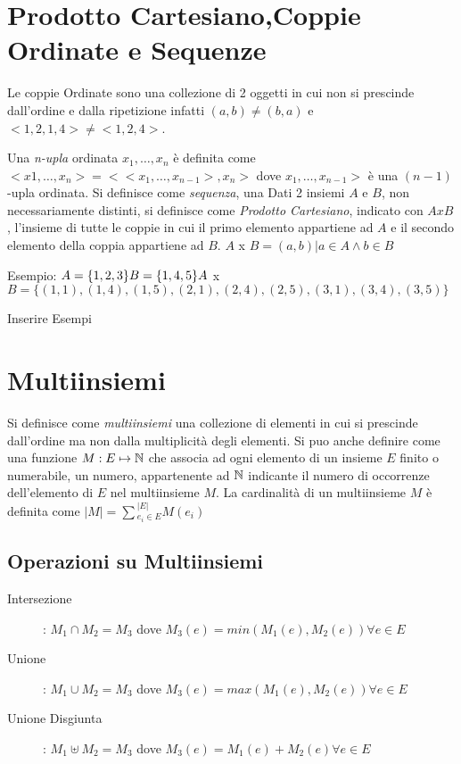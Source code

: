 \section{Prodotto Cartesiano,Coppie Ordinate e Sequenze}
Le coppie Ordinate sono una collezione di 2 oggetti in cui non si prescinde
dall'ordine e dalla ripetizione infatti $(a,b) \neq (b,a)$ e $<1,2,1,4> \neq <1,2,4>$.

Una \emph{n-upla} ordinata $x_1,\dots,x_n$ è definita come $<x1,\dots,x_n> = < <x_1,\dots,x_{n-1}>,x_n>$
dove $x_1,\dots,x_{n-1}>$ è una $(n-1)$-upla ordinata.
Si definisce come \emph{sequenza}, una
Dati 2 insiemi $A$ e $B$, non necessariamente  distinti, si definisce come \textit{Prodotto Cartesiano},
indicato con $A x B$, l'insieme di tutte le coppie in cui il primo elemento appartiene ad $A$
e il secondo elemento della coppia appartiene ad $B$.\newline
$A$ x $B = {(a,b) | a \in A \land b \in B} $

Esempio:\newline
$A = \{1,2,3\} \newline
B = \{1,4,5\} \newline
A$ x $B = \{(1,1),(1,4),(1,5),(2,1),(2,4),(2,5),(3,1),(3,4),(3,5)\} $


Inserire Esempi

\section{Multiinsiemi}
Si definisce come \emph{multiinsiemi} una collezione di elementi in cui si prescinde
dall'ordine ma non dalla multiplicità degli elementi.\newline
Si puo anche definire come una funzione $M:E \mapsto \mathbb{N}$ che associa ad ogni elemento
di un insieme $E$ finito o numerabile, un numero, appartenente ad $\mathbb{N}$ indicante
il numero di occorrenze dell'elemento di $E$ nel multiinsieme $M$.\newline
La cardinalità di un multiinsieme $M$ è definita come $|M| = \sum{_{e_i \in E} ^ {|E|}} M(e_i)$


\subsection{Operazioni su Multiinsiemi}
\begin{description}
    \item[Intersezione]: $M_1 \cap M_2 = M_3$ dove $M_3(e) = min(M_1(e),M_2(e)) \forall e \in E$
    \item[Unione]: $M_1 \cup M_2 = M_3$ dove $M_3(e) = max(M_1(e),M_2(e)) \forall e \in E$
    \item[Unione Disgiunta]: $M_1 \uplus M_2 = M_3$ dove $M_3(e) = M_1(e) + M_2(e) \forall e \in E$
\end{description}
